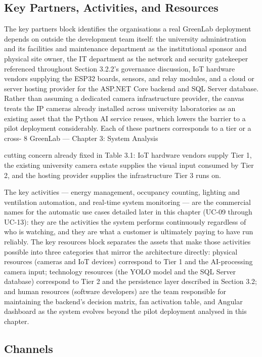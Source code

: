 \subsection{Key Partners, Activities, and Resources}

The key partners block identifies the organisations a real GreenLab deployment depends on outside
the development team itself: the university administration and its facilities and maintenance
department as the institutional sponsor and physical site owner, the IT department as the network
and security gatekeeper referenced throughout Section 3.2.2's governance discussion, IoT
hardware vendors supplying the ESP32 boards, sensors, and relay modules, and a cloud or server
hosting provider for the ASP.NET Core backend and SQL Server database. Rather than assuming a
dedicated camera infrastructure provider, the canvas treats the IP cameras already installed across
university laboratories as an existing asset that the Python AI service reuses, which lowers the
barrier to a pilot deployment considerably. Each of these partners corresponds to a tier or a cross-
8
GreenLab --- Chapter 3: System Analysis


cutting concern already fixed in Table 3.1: IoT hardware vendors supply Tier 1, the existing
university camera estate supplies the visual input consumed by Tier 2, and the hosting provider
supplies the infrastructure Tier 3 runs on.

The key activities --- energy management, occupancy counting, lighting and ventilation
automation, and real-time system monitoring --- are the commercial names for the automatic use
cases detailed later in this chapter (UC-09 through UC-13): they are the activities the system
performs continuously regardless of who is watching, and they are what a customer is ultimately
paying to have run reliably. The key resources block separates the assets that make those activities
possible into three categories that mirror the architecture directly: physical resources (cameras and
IoT devices) correspond to Tier 1 and the AI-processing camera input; technology resources (the
YOLO model and the SQL Server database) correspond to Tier 2 and the persistence layer
described in Section 3.2; and human resources (software developers) are the team responsible for
maintaining the backend's decision matrix, fan activation table, and Angular dashboard as the
system evolves beyond the pilot deployment analysed in this chapter.

\subsection{Channels}

